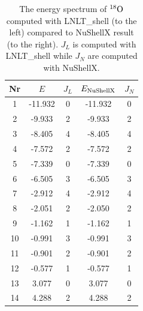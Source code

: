 
\begin{table}[h]
\caption{The energy spectrum of $^{18}\rm{O}$ computed with LNLT\_shell (to the left) compared to NuShellX result (to the right). \(J_L\) is computed with LNLT\_shell while \(J_N\) are computed with NuShellX.}
\label{tab:ox18}
\begin{tabular}{|c|c|c|c|c|}
\hline Nr & \(E\) & \(J_{L}\) & \(E_{\rm{NuShellX}}\) & \(J_{N}\) \\
\hline 1   & -11.932 &       0 & -11.932 & 0 \\
\hline 2   &  -9.933 &       2 & -9.933 & 2 \\
\hline 3   &  -8.405 &       4 & -8.405 & 4 \\
\hline 4   &  -7.572 &       2 & -7.572 & 2 \\
\hline 5   &  -7.339 &       0 & -7.339 & 0 \\
\hline 6   &  -6.505 &       3 & -6.505 & 3 \\
\hline 7   &  -2.912 &       4 & -2.912 & 4 \\
\hline 8   &  -2.051 &       2 & -2.050 & 2 \\
\hline 9   &  -1.162 &       1 & -1.162 & 1 \\
\hline 10  &  -0.991 &       3 & -0.991 & 3 \\
\hline 11  &  -0.901 &       2 & -0.901 & 2 \\
\hline 12  &  -0.577 &       1 & -0.577 & 1 \\
\hline 13  &   3.077 &       0 & 3.077 & 0 \\
\hline 14  &   4.288 &       2 & 4.288 & 2 \\
\hline
\end{tabular}
\end{table}

